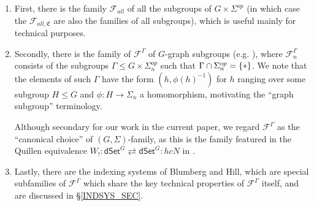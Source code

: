 \documentclass[a4paper,10pt
,draft
]{article}%
\numberwithin{equation}{section}
\numberwithin{figure}{section}
\theoremstyle{definition} %
\newcommand{\F}{\ensuremath{\mathcal F}}
\newcommand{\1}{\ensuremath{\mathbbm 1}}%
\begin{document}
\begin{enumerate}[label = (\alph*)]
	\item First, there is the family $\F_{all}$ of all the subgroups of $G \times \Sigma^{op}$
	(in which case the $\F_{all,\mathfrak{C}}$ are also the families of all subgroups), which is useful mainly for technical purposes.
	
	\item Secondly, there is the family of $\F^{\Gamma}$
	of $G$-graph subgroups (e.g. \cite[Def. 6.36]{BP_geo}),
	where $\F^{\Gamma}_n$ consists of the subgroups
	$\Gamma \leq G \times \Sigma_n^{op}$
	such that $\Gamma \cap \Sigma_n^{op} = \{\**\}$.
	We note that the elements of such $\Gamma$
	have the form $(h,\phi(h)^{-1})$
	for $h$ ranging over some subgroup $H \leq G$
	and $\phi \colon H \to \Sigma_n$
	a homomorphism,
	motivating the ``graph subgroup'' terminology.
	
	Although secondary for our work in the current paper, we regard $\F^{\Gamma}$ as the ``canonical choice'' of
	$(G,\Sigma)$-family, 
	as this is the family featured in the Quillen equivalence
	$W_! \colon 
	\mathsf{dSet}^G \rightleftarrows 
	\mathsf{dSet}^G \colon hcN$
	in \cite[Thm. I]{BP_TAS}.
	
	\item Lastly, there are the indexing systems of Blumberg and Hill,
	which are special subfamilies of $\F^{\Gamma}$
	which share the key technical properties of 
	$\F^{\Gamma}$ itself,
	and are discussed in \S \ref{INDSYS_SEC}.
\end{enumerate}
\end{document}
